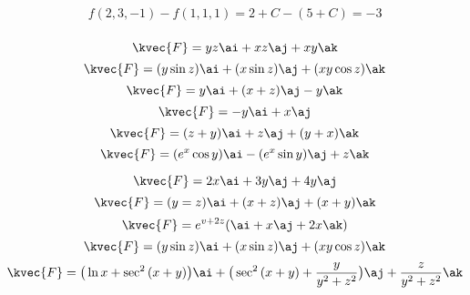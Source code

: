 \begin{align*}
f(2,3,-1)-f(1,1,1)=2+C-(5+C)=-3\\
\end{align*}


\[\kvec{F}=yz\ai+xz\aj+xy\ak\]
\[\kvec{F}=(y\sin{z})\ai+(x\sin{z})\aj+(xy\cos{z})\ak\]
\[\kvec{F}=y\ai+(x+z)\aj-y\ak\]
\[\kvec{F}=-y\ai+x\aj\]
\[\kvec{F}=(z+y)\ai+z\aj+(y+x)\ak\]
\[\kvec{F}=(e^{x}\cos{y})\ai-(e^{x}\sin{y})\aj+z\ak\]

\[\kvec{F}=2x\ai+3y\aj+4y\aj\]
\[\kvec{F}=(y=z)\ai+(x+z)\aj+(x+y)\ak\]
\[\kvec{F}=e^{v+2z}(\ai+x\aj+2x\ak)\]
\[\kvec{F}=(y\sin{z})\ai+(x\sin{z})\aj+(xy\cos{z})\ak\]
\[\kvec{F}=\big(\ln{x}+\sec^{2}{(x+y)}\big)\ai+\big(\sec^{2}{(x+y)}+\frac{y}{y^{2}+z^{2}}\big)\aj+\frac{z}{y^{2}+z^{2}}\ak\]


